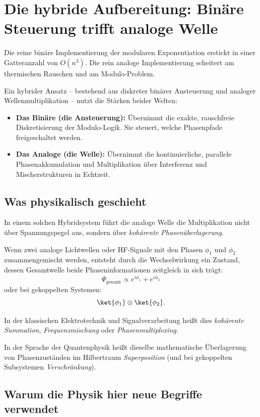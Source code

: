 \section{Die hybride Aufbereitung: Binäre Steuerung trifft analoge Welle}
\label{sec:hybrid}

Die reine binäre Implementierung der modularen Exponentiation erstickt in
einer Gatteranzahl von $O(n^3)$. Die rein analoge Implementierung scheitert
am thermischen Rauschen und am Modulo-Problem.

Ein hybrider Ansatz -- bestehend aus diskreter binärer Ansteuerung und
analoger Wellenmultiplikation -- nutzt die Stärken beider Welten:

\begin{itemize}
  \item \textbf{Das Binäre (die Ansteuerung):} Übernimmt die exakte,
    rauschfreie Diskretisierung der Modulo-Logik. Sie steuert, welche
    Phasenpfade freigeschaltet werden.
  \item \textbf{Das Analoge (die Welle):} Übernimmt die kontinuierliche,
    parallele Phasenakkumulation und Multiplikation über Interferenz und
    Mischerstrukturen in Echtzeit.
\end{itemize}

\subsection{Was physikalisch geschieht}

In einem solchen Hybridsystem führt die analoge Welle die Multiplikation
nicht über Spannungspegel aus, sondern über \emph{kohärente
Phasenüberlagerung}.

Wenn zwei analoge Lichtwellen oder HF-Signale mit den Phasen $\phi_1$
und $\phi_2$ zusammengemischt werden, entsteht durch die Wechselwirkung
ein Zustand, dessen Gesamtwelle beide Phaseninformationen zeitgleich
in sich trägt:
\[
  \Psi_{\text{gesamt}} \propto e^{i\phi_1} + e^{i\phi_2}
\]
oder bei gekoppelten Systemen:
\[
  \ket{\phi_1} \otimes \ket{\phi_2}.
\]

In der klassischen Elektrotechnik und Signalverarbeitung heißt dies
\emph{kohärente Summation}, \emph{Frequenzmischung} oder
\emph{Phasenmultiplexing}.

In der Sprache der Quantenphysik heißt dieselbe mathematische
Überlagerung von Phasenzuständen im Hilbertraum \emph{Superposition}
(und bei gekoppelten Subsystemen \emph{Verschränkung}).

\subsection{Warum die Physik hier neue Begriffe verwendet}

